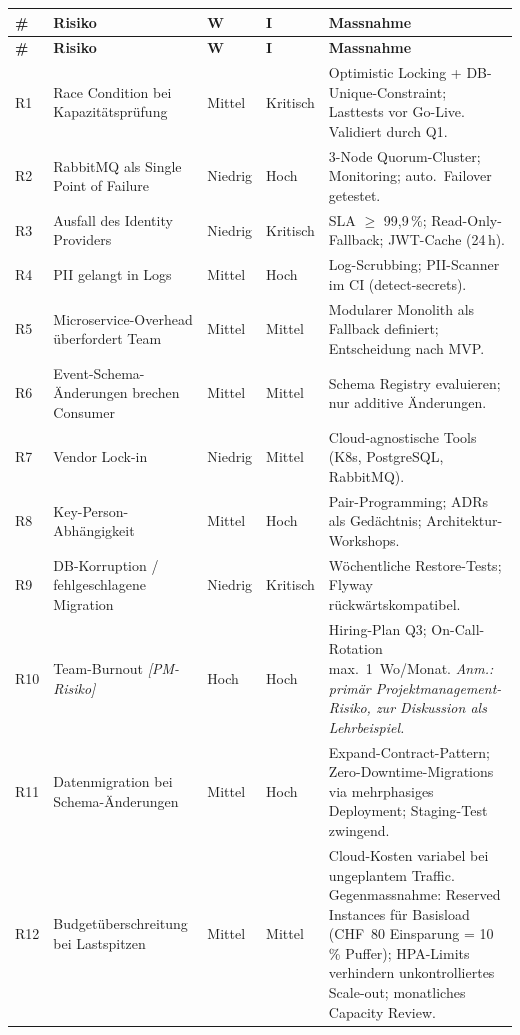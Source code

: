 \begin{longtable}{C{0.5cm} L{3.5cm} C{1.5cm} C{1.5cm} L{5.5cm}}
  \color{white}\textbf{\#} & \color{white}\textbf{Risiko} & \color{white}\textbf{W} & \color{white}\textbf{I} & \color{white}\textbf{Massnahme} \\
  \endfirsthead
  \color{white}\textbf{\#} & \color{white}\textbf{Risiko} & \color{white}\textbf{W} & \color{white}\textbf{I} & \color{white}\textbf{Massnahme} \\
  \endhead

  R1 & Race Condition bei Kapazitätsprüfung & Mittel & Kritisch & Optimistic Locking + DB-Unique-Constraint; Lasttests vor Go-Live. Validiert durch Q1. \\
  R2 & RabbitMQ als Single Point of Failure & Niedrig & Hoch & 3-Node Quorum-Cluster; Monitoring; auto.\ Failover getestet. \\
  R3 & Ausfall des Identity Providers & Niedrig & Kritisch & SLA $\geq$ 99,9\,\%; Read-Only-Fallback; JWT-Cache (24\,h). \\
  R4 & PII gelangt in Logs & Mittel & Hoch & Log-Scrubbing; PII-Scanner im CI (detect-secrets). \\
  R5 & Microservice-Overhead überfordert Team & Mittel & Mittel & Modularer Monolith als Fallback definiert; Entscheidung nach MVP. \\
  R6 & Event-Schema-Änderungen brechen Consumer & Mittel & Mittel & Schema Registry evaluieren; nur additive Änderungen. \\
  R7 & Vendor Lock-in & Niedrig & Mittel & Cloud-agnostische Tools (K8s, PostgreSQL, RabbitMQ). \\
  R8 & Key-Person-Abhängigkeit & Mittel & Hoch & Pair-Programming; ADRs als Gedächtnis; Architektur-Workshops. \\
  R9 & DB-Korruption / fehlgeschlagene Migration & Niedrig & Kritisch & Wöchentliche Restore-Tests; Flyway rückwärtskompatibel. \\
  R10 & Team-Burnout \textit{[PM-Risiko]} & Hoch & Hoch & Hiring-Plan Q3; On-Call-Rotation max.\ 1~Wo/Monat. \textit{Anm.: primär Projektmanagement-Risiko, zur Diskussion als Lehrbeispiel.} \\
  R11 & Datenmigration bei Schema-Änderungen & Mittel & Hoch & Expand-Contract-Pattern; Zero-Downtime-Migrations via mehrphasiges Deployment; Staging-Test zwingend. \\
  R12 & Budgetüberschreitung bei Lastspitzen & Mittel & Mittel & Cloud-Kosten variabel bei ungeplantem Traffic. Gegenmassnahme: Reserved Instances für Basisload (CHF~80 Einsparung = 10\,\% Puffer); HPA-Limits verhindern unkontrolliertes Scale-out; monatliches Capacity Review. \\
\end{longtable}

